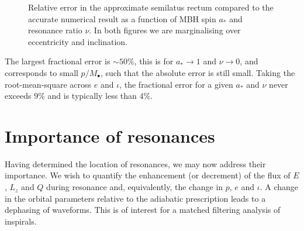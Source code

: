 \begin{figure}%
\centering
  \quad {}
\caption{Relative error in the approximate semilatus rectum compared to the accurate numerical result as a function of MBH spin $a_\ast$ and resonance ratio $\nu$. In both figures we are marginalising over eccentricity and inclination.}\label{fig:p-error}
\end{figure}
The largest fractional error is $\sim50\%$, this is for $a_\ast \rightarrow 1$ and $\nu \rightarrow 0$, and corresponds to small $p/M_\bullet$, such that the absolute error is still small. Taking the root-mean-square across $e$ and $\iota$, the fractional error for a given $a_\ast$ and $\nu$ never exceeds $9\%$ and is typically less than $4\%$.

\section{Importance of resonances}\label{sec:importance}

Having determined the location of resonances, we may now address their importance. We wish to quantify the enhancement (or decrement) of the flux of $E$, $L_z$ and $Q$ during resonance and, equivalently, the change in $p$, $e$ and $\iota$. A change in the orbital parameters relative to the adiabatic prescription leads to a dephasing of waveforms. This is of interest for a matched filtering analysis of inspirals.

